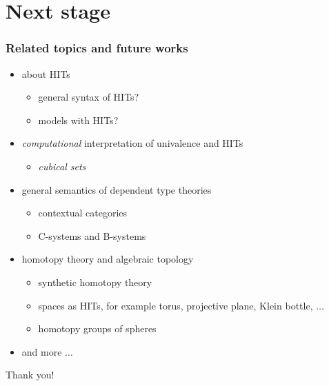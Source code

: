 \documentclass[dvipdfmx]{beamer}
\begin{document}
\section{Next stage}

\begin{frame}
  \frametitle{Related topics and future works}
  \begin{itemize}
      \pause
    \item about HITs
      \begin{itemize}
        \item general syntax of HITs?
        \item models with HITs?
      \end{itemize}
      \pause
    \item {\it computational} interpretation of
      univalence and HITs
      \begin{itemize}
        \item {\it cubical sets}
          \cite{bezem_et_al:LIPIcs:2014:4628}
      \end{itemize}
      \pause
    \item general semantics of dependent type theories
      \begin{itemize}
        \item contextual categories
          \cite{Cartmell1986209}
        \item C-systems and B-systems
          \cite{voevodsky2014subsystems,voevodsky2014bsystems}
      \end{itemize}
      \pause
    \item homotopy theory and algebraic topology
      \begin{itemize}
        \item synthetic homotopy theory
        \item spaces as HITs, for example
          torus, projective plane, Klein bottle, $\dots$
        \item homotopy groups of spheres
      \end{itemize}
    \item and more $\dots$
  \end{itemize}
\end{frame}

\begin{frame}
  \begin{center}
    Thank you!
  \end{center}
\end{frame}

\begin{frame}
\end{frame}
\end{document}

